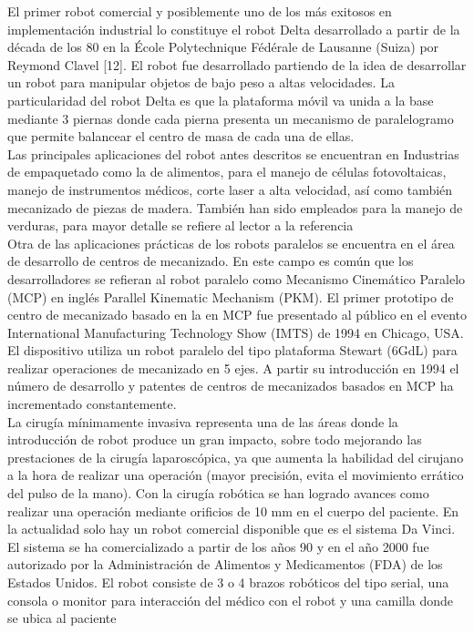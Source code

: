 \documentclass[12pt,a4paper]{article}
\begin{document}
El primer robot comercial y posiblemente uno de los más exitosos en implementación industrial lo constituye el robot Delta desarrollado a partir de la década de los 80 en la École Polytechnique Fédérale de Lausanne (Suiza) por Reymond Clavel [12]. El robot fue desarrollado partiendo de la idea de desarrollar un robot para manipular objetos de bajo peso a altas velocidades. La particularidad del robot Delta es que la plataforma móvil va unida a la base mediante 3 piernas donde cada pierna presenta un mecanismo de paralelogramo que permite balancear el centro de masa de cada una de ellas.\\
Las principales aplicaciones del robot antes descritos se encuentran en Industrias de empaquetado como la de alimentos, para el manejo de células fotovoltaicas, manejo de instrumentos médicos, corte laser a alta velocidad, así como también mecanizado de piezas de madera. También han sido empleados para la manejo de verduras, para mayor detalle se refiere al lector a la referencia\\

Otra de las aplicaciones prácticas de los robots paralelos se encuentra en el área de desarrollo de centros de mecanizado. En este campo es común que los desarrolladores se refieran al robot paralelo como Mecanismo Cinemático Paralelo (MCP) en inglés Parallel Kinematic Mechanism (PKM). El primer prototipo de centro de mecanizado basado en la en MCP fue presentado al público en el evento International Manufacturing Technology Show (IMTS) de 1994 en Chicago, USA. El dispositivo utiliza un robot paralelo del tipo plataforma Stewart (6GdL) para realizar operaciones de mecanizado en 5 ejes. A partir su introducción en 1994 el número de desarrollo y patentes de centros de mecanizados basados en MCP ha incrementado constantemente.\\

La cirugía mínimamente invasiva representa una de las áreas donde la introducción de robot 
produce un gran impacto, sobre todo mejorando las prestaciones de la cirugía laparoscópica, ya que aumenta la habilidad del cirujano a la hora de realizar una operación (mayor precisión, evita el movimiento errático del pulso de la mano). Con la cirugía robótica se han logrado avances como realizar una operación mediante orificios de 10 mm en el cuerpo del paciente. En la actualidad solo hay un robot comercial disponible que es el sistema Da Vinci. El sistema se ha comercializado a partir de los años 90 y en el año 2000 fue autorizado por la Administración de Alimentos y Medicamentos (FDA) de los Estados Unidos. El robot consiste de 3 o 4 brazos robóticos del tipo serial, una consola o monitor para interacción del médico con el robot y una camilla donde se ubica al paciente
\end{document}

